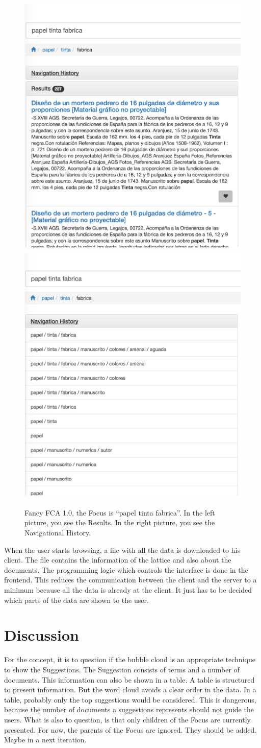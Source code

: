 \documentclass[11pt]{report}
\begin{document}
\begin{figure}[!ht]
\includegraphics[width=.48\linewidth]{images/fancy4}\hfill
\includegraphics[width=.48\linewidth]{images/fancy3}
\caption{Fancy FCA 1.0, the Focus is ``papel tinta fabrica''. In the left picture, you see the Results. In the right picture, you see the Navigational History.}
\label{figure:fancy3}
\end{figure}

When the user starts browsing, a  file with all the data is downloaded to his client. The file contains the information of the lattice and also about the documents. The programming logic which controls the interface is done in the frontend. This reduces the communication between the client and the server to a minimum because all the data is already at the client. It just has to be decided which parts of the data are shown to the user.

\section{Discussion}

For the concept, it is to question if the bubble cloud is an appropriate technique to show the Suggestions. The Suggestion consists of terms and a number of documents. This information can also be shown in a table. A table is structured to present information. But the word cloud avoids a clear order in the data. In a table, probably only the top suggestions would be considered. This is dangerous, because the number of documents a suggestions represents should not guide the users. What is also to question, is that only children of the Focus are currently presented. For now, the parents of the Focus are ignored. They should be added. Maybe in a next iteration.\\
\end{document}
